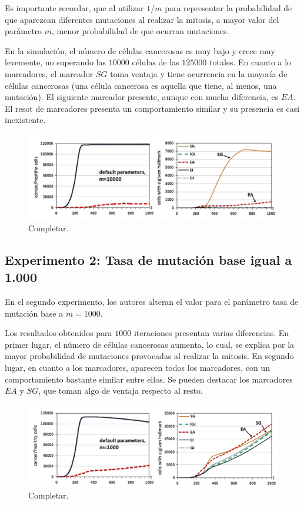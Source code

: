 Es importante recordar, que al utilizar $1/m$ para representar la probabilidad
de que aparezcan diferentes mutaciones al realizar la mitosis, a mayor valor
del parámetro $m$, menor probabilidad de que ocurran mutaciones.

En la simulación, el número de células cancerosas es muy bajo y crece muy levemente,
no superando las $10000$ células de las $125000$ totales. En cuanto a lo marcadores,
el marcador $SG$ toma ventaja y tiene ocurrencia en la mayoría de células cancerosas
(una célula cancerosa es aquella que tiene, al menos, una mutación). El siguiente marcador
presente, aunque con mucha diferencia, es $EA$. El resot de marcadores presenta
un comportamiento similar y su presencia es casi inexistente.

\begin{figure}[h]
\centering
\includegraphics[scale=0.6]{figures/experiments/exp1}
\caption{Completar.}
\end{figure}

\subsection{Experimento 2: Tasa de mutación base igual a 1.000}

En el segundo experimento, los autores alteran el valor para el parámetro tasa de
mutación base a $m=1000$.

Los resultados obtenidos para $1000$ iteraciones presentan varias diferencias. En primer lugar,
el número de células cancerosas aumenta, lo cual, se explica por la mayor probabilidad
de mutaciones provocadas al realizar la mitosis. En segundo lugar, en cuanto a los marcadores,
aparecen todos los marcadores, con un comportamiento bastante similar entre ellos. Se pueden
destacar los marcadores $EA$ y $SG$, que toman algo de ventaja respecto al resto.

\begin{figure}[h]
\centering
\includegraphics[scale=0.6]{figures/experiments/exp2}
\caption{Completar.}
\end{figure}

